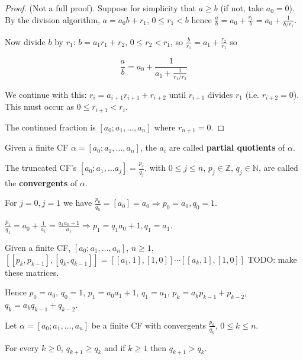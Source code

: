 \begin{proof}
	(Not a full proof). Suppose for simplicity that $a \ge b$ (if not, take $a_0 = 0$). By the division algorithm, $a = a_0 b + r_1$, $0 \le r_1 < b$ hence $\frac{a}{b} = a_0 + \frac{r_1}{b} = a_0 + \frac{1}{b / r_1}$.

	Now divide $b$ by $r_1$: $b = a_1 r_1 + r_2$, $0 \le r_2 < r_1$, so $\frac{b}{r_1} = a_1 + \frac{r_2}{r_1}$ so
	
	\[ \frac{a}{b} = a_0 + \frac{1}{a_1 + \frac{1}{r_1 / r_2}} \]

	We continue with this: $r_i = a_{i + 1} r_{i + 1} + r_{i + 2}$ until $r_{i + 1}$ divides $r_1$ (i.e. $r_{i + 2} = 0$). This must occur as $0 \le r_{i + 1} < r_i$.

	The continued fraction is $[a_0; a_1, \ldots, a_n]$ where $r_{n + 1} = 0$.
\end{proof}

\begin{definition}
	Given a finite CF $\alpha = [a_0; a_1, \ldots, a_n]$, the $a_i$ are called \textbf{partial quotients} of $\alpha$.

	The truncated CF's $[a_0; a_1, \ldots a_j] = \frac{p_j}{q_j}$, with $0 \le j \le n$, $p_j \in \mathbb{Z}$, $q_j \in \mathbb{N}$, are called the \textbf{convergents} of $\alpha$.

	For $j = 0, j = 1$ we have $\frac{p_0}{q_0} = [a_0] = a_0 \Rightarrow p_0 = a_0, q_0 = 1$.

	$\frac{p_1}{q_1} = a_0 + \frac{1}{a_1} = \frac{a_1 a_0 + 1}{a_1} \Rightarrow p_1 = q_1 a_0 + 1, q_1 = a_1$.
\end{definition}

\begin{proposition}
	Given a finite CF, $[a_0; a_1, \ldots, a_n]$, $n \ge 1$, $[[p_k, p_{k - 1}], [q_k, q_{k - 1}]] = [[a_1, 1], [1, 0]] \cdots [[a_k, 1], [1, 0]]$ TODO: make these matrices.

	Hence $p_0 = a_0$, $q_0 = 1$, $p_1 = a_0 a_1 + 1$, $q_1 = a_1$, $p_k = a_k p_{k - 1} + p_{k - 2}$, $q_k = a_k q_{k - 1} + q_{k - 2}$.
\end{proposition}

\begin{lemma}
	Let $\alpha = [a_0; a_1, \ldots, a_n]$ be a finite CF with convergents $\frac{p_k}{q_k}$, $0 \le k \le n$.

	For every $k \ge 0$, $q_{k + 1} \ge q_k$ and if $k \ge 1$ then $q_{k + 1} > q_k$.
\end{lemma}

